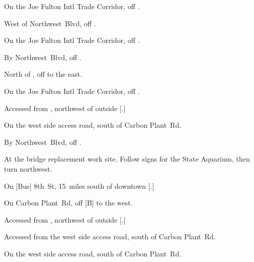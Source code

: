 
\begin{LocationList}

On the Joe Fulton Intl Trade Corridor, off  .

\Location{\GarageHQ \Garage}
West of  Northwest~Blvd, off .

On the Joe Fulton Intl Trade Corridor, off  .

By  Northwest~Blvd, off .

North of , off   to the east.

On the Joe Fulton Intl Trade Corridor, off  .

Accessed from , northwest of  outside [.]

\Location{\RecruitmentAgency \Recruitment}
On the west side  access road, south of Carbon Plant~Rd.

By  Northwest~Blvd, off .

At the  bridge replacement work site. Follow signs for the State Aquarium, then turn northwest.

On [Bus] 8th~St, 15~miles south of downtown [.]

\Location{\TruckStop \Gas \Rest \Service}
On Carbon Plant~Rd, off  [B] to the west.

Accessed from , northwest of  outside [.]

Accessed from the west side  access road, south of Carbon Plant~Rd.

On the west side  access road, south of Carbon Plant~Rd.

\end{LocationList}
